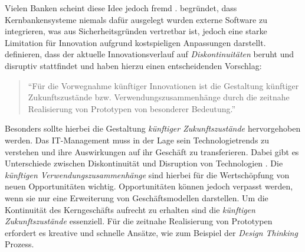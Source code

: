 Vielen Banken scheint diese Idee jedoch fremd \cite{Eismann2015}.
\citet{Eismann2015} begründet, dass Kernbankensysteme niemals dafür ausgelegt wurden externe Software zu integrieren, was aus Sicherheitsgründen vertretbar ist, jedoch eine starke Limitation für Innovation aufgrund kostspieligen Anpassungen darstellt.
\medskip
\\
\citet[S. 14]{Alt2017} definieren, dass der aktuelle Innovationsverlauf auf \emph{Diskontinuitäten} beruht und disruptiv stattfindet und haben hierzu einen entscheidenden Vorschlag:
\begin{quote}
\enquote{Für die Vorwegnahme künftiger Innovationen ist die Gestaltung künftiger
Zukunftszustände bzw. Verwendungszusammenhänge durch die zeitnahe Realisierung von Prototypen von besonderer Bedeutung.}
\end{quote}
Besonders sollte hierbei die Gestaltung \emph{künftiger Zukunftszustände \cite{Alt2017}} hervorgehoben werden. Das IT-Management muss in der Lage sein Technologietrends zu verstehen und ihre Auswirkungen auf ihr Geschäft zu transferieren. Dabei gibt es Unterschiede zwischen Diskontinuität und Disruption von Technologien \cite{Fernandez:2020}.  Die \emph{künftigen Verwendungszusammenhänge} sind hierbei für die Wertschöpfung von neuen Opportunitäten wichtig. Opportunitäten können jedoch verpasst werden, wenn sie nur eine Erweiterung von Geschäftsmodellen darstellen. Um die Kontinuität des Kerngeschäfts aufrecht zu erhalten sind die \emph{künftigen Zukunftszustände \cite{Alt2017}} essenziell. Für die zeitnahe Realisierung von Prototypen erfordert es kreative \cite{Alt2017} und schnelle Ansätze, wie zum Beispiel der \emph{Design Thinking} Prozess.

